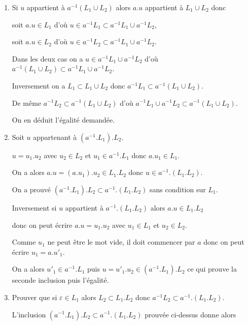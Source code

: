 \begin{Answer}
\begin{enumerate}
\item Si $u$ appartient à $a^{-1}(L_1\cup L_2)$ alors $a.u$ appartient à $L_1\cup L_2$ donc 

soit $a.u\in L_1$ d'où $u\in a^{-1}L_1\subset a^{-1}L_1 \cup a^{-1}L_2$, 

soit $a.u\in L_2$ d'où $u\in a^{-1}L_2\subset a^{-1}L_1 \cup a^{-1}L_2$.

Dans les deux cas on a $u\in  a^{-1}L_1 \cup a^{-1}L_2$ d'où  $a^{-1}(L_1\cup L_2) \subset a^{-1}L_1 \cup a^{-1}L_2$.

\smallskip

Inversement on a $L_1 \subset L_1\cup L_2$ donc $a^{-1}L_1 \subset a^{-1}(L_1\cup L_2)$.

De même $a^{-1}L_2 \subset a^{-1}(L_1\cup L_2)$ d'où $a^{-1}L_1 \cup a^{-1}L_2\subset a^{-1}(L_1\cup L_2)$.

On en déduit l'égalité demandée.
\item Soit $u$ appartenant à $(a^{-1}.L_1).L_2$.

$u=u_1.u_2$ avec $u_2\in L_2$ et $u_1\in a^{-1}.L_1$ donc $a.u_1\in L_1$.

On a alors $a.u=(a.u_1).u_2\in L_1.L_2$ donc $u\in a^{-1}.(L_1.L_2)$.

On a prouvé $(a^{-1}.L_1).L_2\subset  a^{-1}.(L_1.L_2)$ sans condition sur $L_1$.

\smallskip

Inversement si $u$ appartient à $a^{-1}.(L_1.L_2)$ alors $a.u\in L_1.L_2$ 

donc on peut écrire $a.u = u_1.u_2$ avec $u_1\in L_1$ et $u_2\in L_2$.

Comme $u_1$ ne peut être le mot vide, il doit commencer par $a$ donc on peut écrire $u_1= a.u'_1$.

On a alors $u'_1\in a^{-1}.L_1$ puis $u=u'_1.u_2\in (a^{-1}.L_1).L_2$ ce qui prouve la seconde inclusion puis l'égalité.
\item Prouver que si $\varepsilon \in L_1$ alors $L_2\subset L_1.L_2$ donc $a^{-1}L_2 \subset a^{-1}.(L_1.L_2)$.

L'inclusion $(a^{-1}.L_1).L_2\subset  a^{-1}.(L_1.L_2)$ prouvée ci-dessus donne alors 


\end{enumerate}
\end{Answer}
